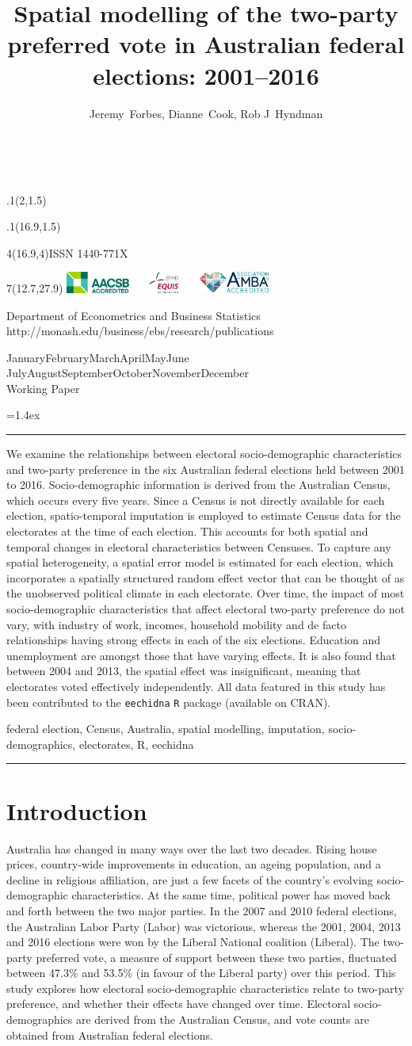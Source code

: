 \documentclass[11pt,a4paper,]{article}
\title{Spatial modelling of the two-party preferred vote in Australian federal
elections: 2001--2016}
\author{Jeremy~Forbes, Dianne~Cook, Rob J~Hyndman}
\date{\sf\Date~\Month~\Year}
\makeatletter
\def\Date{\number\day}
\def\Month{\ifcase\month\or
 January\or February\or March\or April\or May\or June\or
 July\or August\or September\or October\or November\or December\fi}
\def\Year{\number\year}
\def\showjel{{\large\textsf{\textbf{JEL classification:}}~\@jel}}
\def\cover{{\sffamily\setcounter{page}{0}
        \thispagestyle{empty}
        \placefig{2}{1.5}{width=5cm}{monash2}
        \placefig{16.9}{1.5}{width=2.1cm}{MBusSchool}
        \begin{textblock}{4}(16.9,4)ISSN 1440-771X\end{textblock}
        \begin{textblock}{7}(12.7,27.9)\hfill
        \includegraphics[height=0.7cm]{AACSB}~~~
        \includegraphics[height=0.7cm]{EQUIS}~~~
        \includegraphics[height=0.7cm]{AMBA}
        \end{textblock}
        \vspace*{2cm}
        \begin{center}\Large
        Department of Econometrics and Business Statistics\\[.5cm]
        \footnotesize http://monash.edu/business/ebs/research/publications
        \end{center}\vspace{2cm}
        \begin{center}
        \fbox{\parbox{14cm}{\begin{onehalfspace}\centering\Huge\vspace*{0.3cm}
                \textsf{\textbf{\expandafter{\@title}}}\vspace{1cm}\par
                \LARGE\@author\end{onehalfspace}
        }}
        \end{center}
        \vfill
                \begin{center}\Large
                \Month~\Year\\[1cm]
                Working Paper \@wp
        \end{center}\vspace*{2cm}}}
\def\pageone{{\sffamily\setstretch{1}%
        \thispagestyle{empty}%
        \vbox to \textheight{%
        \raggedright\baselineskip=1.2cm
     {\fontsize{24.88}{30}\sffamily\textbf{\expandafter{\@title}}}
        \vspace{2cm}\par
        \hspace{1cm}\parbox{14cm}{\sffamily\large\@addresses}\vspace{1cm}\vfill
        \hspace{1cm}{\large\Date~\Month~\Year}\\[1cm]
        \hspace{1cm}\showjel\vss}}}
\def\blindtitle{{\sffamily
     \thispagestyle{plain}\raggedright\baselineskip=1.2cm
     {\fontsize{24.88}{30}\sffamily\textbf{\expandafter{\@title}}}\vspace{1cm}\par
        }}
\def\titlepage{{\cover\newpage\pageone\newpage\blindtitle}}
\let\maketitle\titlepage
\newenvironment{keywords}{\par\vspace{0.5cm}\noindent{\sffamily\textbf{Keywords:}}}{\vspace{0.25cm}\par\hrule\vspace{0.5cm}\par}
\renewenvironment{abstract}{\begin{minipage}{\textwidth}\parskip=1.4ex\noindent
\hrule\vspace{0.1cm}\par{\sffamily\textbf{\abstractname}}\newline}
  {\end{minipage}}
\def\placefig#1#2#3#4{\begin{textblock}{.1}(#1,#2)\rlap{\texttt{[image: \#4]}}\end{textblock}}
\makeatother
\begin{document}
\maketitle
\begin{abstract}
We examine the relationships between electoral socio-demographic
characteristics and two-party preference in the six Australian federal
elections held between 2001 to 2016. Socio-demographic information is
derived from the Australian Census, which occurs every five years. Since
a Census is not directly available for each election, spatio-temporal
imputation is employed to estimate Census data for the electorates at
the time of each election. This accounts for both spatial and temporal
changes in electoral characteristics between Censuses. To capture any
spatial heterogeneity, a spatial error model is estimated for each
election, which incorporates a spatially structured random effect vector
that can be thought of as the unobserved political climate in each
electorate. Over time, the impact of most socio-demographic
characteristics that affect electoral two-party preference do not vary,
with industry of work, incomes, household mobility and de facto
relationships having strong effects in each of the six elections.
Education and unemployment are amongst those that have varying effects.
It is also found that between 2004 and 2013, the spatial effect was
insignificant, meaning that electorates voted effectively independently.
All data featured in this study has been contributed to the
\texttt{eechidna} \texttt{R} package (available on CRAN).
\end{abstract}
\begin{keywords}
federal election, Census, Australia, spatial modelling, imputation,
socio-demographics, electorates, R, eechidna
\end{keywords}

\section{Introduction}\label{intro}

Australia has changed in many ways over the last two decades. Rising
house prices, country-wide improvements in education, an ageing
population, and a decline in religious affiliation, are just a few
facets of the country's evolving socio-demographic characteristics. At
the same time, political power has moved back and forth between the two
major parties. In the 2007 and 2010 federal elections, the Australian
Labor Party (Labor) was victorious, whereas the 2001, 2004, 2013 and
2016 elections were won by the Liberal National coalition (Liberal). The
two-party preferred vote, a measure of support between these two
parties, fluctuated between 47.3\% and 53.5\% (in favour of the Liberal
party) over this period. This study explores how electoral
socio-demographic characteristics relate to two-party preference, and
whether their effects have changed over time. Electoral
socio-demographics are derived from the Australian Census, and vote
counts are obtained from Australian federal elections.
\end{document}
